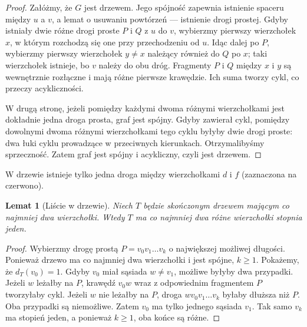 \documentclass[11pt,a4paper]{report}
\numberwithin{equation}{section}
\theoremstyle{plain}
\newtheorem{lemat}[twierdzenie]{Lemat}
\theoremstyle{definition}
\theoremstyle{remark}
\begin{document}
\begin{proof}
Załóżmy, że $G$ jest drzewem. Jego spójność zapewnia
istnienie spaceru między $u$ a $v$, a lemat o usuwaniu
powtórzeń --- istnienie drogi prostej. Gdyby istniały
dwie różne drogi proste $P$ i $Q$ z $u$ do $v$,
wybierzmy pierwszy wierzchołek $x$, w którym
rozchodzą się one przy przechodzeniu od $u$.
Idąc dalej po $P$, wybierzmy pierwszy wierzchołek
$y\ne x$ należący również do $Q$ po $x$;
taki wierzchołek istnieje, bo $v$ należy do obu
dróg. Fragmenty $P$ i $Q$ między $x$ i $y$
są wewnętrznie rozłączne i mają różne pierwsze
krawędzie. Ich suma tworzy cykl, co przeczy
acykliczności.

W drugą stronę, jeżeli pomiędzy każdymi dwoma
różnymi wierzchołkami jest dokładnie jedna droga
prosta, graf jest spójny. Gdyby zawierał cykl,
pomiędzy dowolnymi dwoma różnymi wierzchołkami
tego cyklu byłyby dwie drogi proste: dwa łuki
cyklu prowadzące w przeciwnych kierunkach.
Otrzymalibyśmy sprzeczność. Zatem graf jest
spójny i acykliczny, czyli jest drzewem.
\end{proof}

\begin{center}

{\footnotesize W drzewie istnieje tylko jedna droga między
wierzchołkami $d$ i $f$ (zaznaczona na czerwono).}
\end{center}

\begin{lemat}[Liście w drzewie]
Niech $T$ będzie skończonym drzewem mającym
co najmniej dwa wierzchołki. Wtedy $T$ ma
co najmniej dwa różne wierzchołki stopnia jeden.
\end{lemat}

\begin{proof}
Wybierzmy drogę prostą $P=v_0v_1\ldots v_k$
o największej możliwej długości. Ponieważ drzewo
ma co najmniej dwa wierzchołki i jest spójne,
$k\ge1$. Pokażemy, że $d_T(v_0)=1$.
Gdyby $v_0$ miał sąsiada $w\ne v_1$, możliwe
byłyby dwa przypadki. Jeżeli $w$ leżałby na
$P$, krawędź $v_0w$ wraz z odpowiednim fragmentem
$P$ tworzyłaby cykl. Jeżeli $w$ nie leżałby
na $P$, droga $wv_0v_1\ldots v_k$ byłaby
dłuższa niż $P$. Oba przypadki są niemożliwe.
Zatem $v_0$ ma tylko jednego sąsiada $v_1$.
Tak samo $v_k$ ma stopień jeden, a ponieważ
$k\ge1$, oba końce są różne.
\end{proof}
\end{document}
